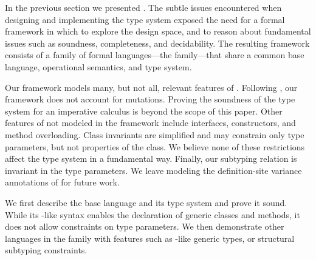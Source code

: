 \newcommand\comma{,~}
\newcommand\tj[2]{{#1} \vdash_{\cal T}{#2}}
\newcommand\cj[2]{{#1} \vdash_{\cal C}{#2}}
\newcommand\wj[2]{{#1} \vdash_{\cal W}{#2}}
\newcommand\cdecl{{\tt class}~{\tt C}[\tbar{X}]\{{\tt c}\}(\tbar{f}\ty\tbar{F})~{\tt extends}~{\tt D}[\tbar{E}]~\{~\tbar{M}~\}}
\newcommand\msign[5]{{\tt m}[\tbar{#1}](\tbar{#2}\ty\tbar{#3})\{{\tt #4}\}\ty{\tt #5}}
\newcommand\minst[6]{\msign{#1}{#2}{#3}{#4}{#5}={\tt #6}}
\newcommand\mdecl[6]{{\tt def}~\minst{#1}{#2}{#3}{#4}{#5}{#6}}
\newcommand{\vdashQ}{\vdash_{\cal X}}
\newcommand{\vdashS}{\vdash_{\cal X}}
\newcommand{\Dom}{{\sf Dom}}
\newcommand{\Img}{{\sf Rng}}

In the previous section we presented \Xten. The subtle issues encountered when designing and implementing the \Xten type system exposed the need for a formal framework in which to explore the design space, and to reason about fundamental issues such as soundness, completeness, and decidability. The resulting framework consists of a family of formal languages---the \FXG family---that share a common base language, operational semantics, and type system.

Our framework models many, but not all, relevant features of \Xten.
Following \FJ, our framework does not account for mutations. Proving the soundness of the type system for an imperative calculus is beyond the scope of this paper.
Other features of \Xten not modeled in the framework include interfaces, constructors, and method overloading. Class invariants are simplified and may constrain only type parameters, but not properties of the class.  We believe none of these restrictions affect the type system in a fundamental way. Finally, our subtyping relation is invariant in the type parameters. We leave modeling the definition-site variance annotations of \Xten for future work.

We first describe the base \FXG language and its type system and prove it sound. While its \FGJ-like syntax enables the declaration of generic classes and methods, it does not allow constraints on type parameters. We then demonstrate other languages in the family with features such as \FGJ-like generic types, or structural subtyping constraints.

